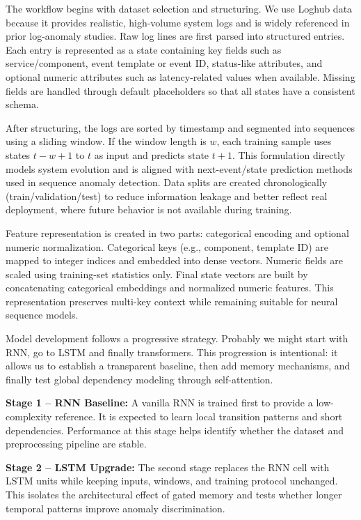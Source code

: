\documentclass[12pt]{article}
\begin{document}
The workflow begins with dataset selection and structuring. We use Loghub data because it provides realistic, high-volume system logs and is widely referenced in prior log-anomaly studies. Raw log lines are first parsed into structured entries. Each entry is represented as a state containing key fields such as service/component, event template or event ID, status-like attributes, and optional numeric attributes such as latency-related values when available. Missing fields are handled through default placeholders so that all states have a consistent schema.

After structuring, the logs are sorted by timestamp and segmented into sequences using a sliding window. If the window length is $w$, each training sample uses states $t-w+1$ to $t$ as input and predicts state $t+1$. This formulation directly models system evolution and is aligned with next-event/state prediction methods used in sequence anomaly detection. Data splits are created chronologically (train/validation/test) to reduce information leakage and better reflect real deployment, where future behavior is not available during training.

Feature representation is created in two parts: categorical encoding and optional numeric normalization. Categorical keys (e.g., component, template ID) are mapped to integer indices and embedded into dense vectors. Numeric fields are scaled using training-set statistics only. Final state vectors are built by concatenating categorical embeddings and normalized numeric features. This representation preserves multi-key context while remaining suitable for neural sequence models.

Model development follows a progressive strategy. Probably we might start with RNN, go to LSTM and finally transformers. This progression is intentional: it allows us to establish a transparent baseline, then add memory mechanisms, and finally test global dependency modeling through self-attention.

\textbf{Stage 1 -- RNN Baseline:}
A vanilla RNN is trained first to provide a low-complexity reference. It is expected to learn local transition patterns and short dependencies. Performance at this stage helps identify whether the dataset and preprocessing pipeline are stable.

\textbf{Stage 2 -- LSTM Upgrade:}
The second stage replaces the RNN cell with LSTM units while keeping inputs, windows, and training protocol unchanged. This isolates the architectural effect of gated memory and tests whether longer temporal patterns improve anomaly discrimination.
\end{document}
